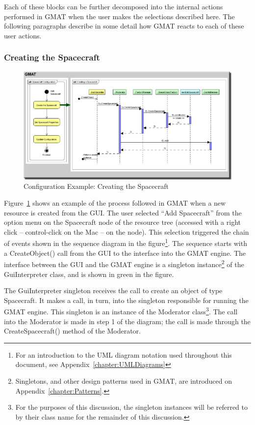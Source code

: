 Each of these blocks can be further decomposed into the internal actions performed in GMAT when the
user makes the selections described here.  The following paragraphs describe in some detail how GMAT
reacts to each of these user actions.

\subsubsection{\label{section:ObjectCreation}Creating the Spacecraft}

\begin{figure}[htb]
\begin{center}
\includegraphics[scale=0.8]{Images/SpacecraftCreation.eps}
\caption[Configuration Example: Creating the
Spacecraft]{\label{figure:CreatingResource}Configuration Example: Creating the Spacecraft}
\end{center}
\end{figure}

Figure~\ref{figure:CreatingResource} shows an example of the process followed in GMAT when a new
resource is created from the GUI.  The user selected ``Add Spacecraft'' from the option menu on the
Spacecraft node of the resource tree (accessed with a right click -- control-click on the Mac -- on
the node).  This selection triggered the chain of events shown in the sequence diagram in the
figure\footnote{For an introduction to the UML diagram notation used throughout this document, see
Appendix~\ref{chapter:UMLDiagrams}}.  The sequence starts with a CreateObject() call from the GUI to
the interface into the GMAT engine.  The interface between the GUI and the GMAT engine is a
singleton instance\footnote{Singletons, and other design patterns used in GMAT, are introduced on
Appendix~\ref{chapter:Patterns}.} of the GuiInterpreter class, and is shown in green in the figure.

The GuiInterpreter singleton receives the call to create an object of type Spacecraft.  It makes a
call, in turn, into the singleton responsible for running the GMAT engine.  This singleton is an
instance of the Moderator class\footnote{For the purposes of this discussion, the singleton
instances will be referred to by their class name for the remainder of this discussion.}.  The call
into the Moderator is made in step 1 of the diagram; the call is made through the CreateSpacecraft()
method of the Moderator.

